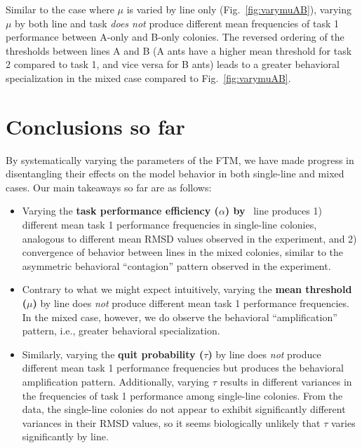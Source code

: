 \documentclass[11pt]{article}
\begin{document}
Similar to the case where $\mu$ is varied by line only (Fig.~\ref{fig:varymuAB}), varying $\mu$ by both line and task \textit{does not} produce different mean frequencies of task 1 performance between A-only and B-only colonies. The reversed ordering of the thresholds between lines A and B (A ants have a higher mean threshold for task 2 compared to task 1, and vice versa for B ants) leads to a greater behavioral specialization in the mixed case compared to Fig.~\ref{fig:varymuAB}.

\section{Conclusions so far}

By systematically varying the parameters of the FTM, we have made progress in disentangling their effects on the model behavior in both single-line and mixed cases. Our main takeaways so far are as follows:

\begin{itemize}
	\item Varying the \textbf{task performance efficiency ($\alpha$) by }\ line produces 1) different mean task 1 performance frequencies in single-line colonies, analogous to different mean RMSD values observed in the experiment, and 2) convergence of behavior between lines in the mixed colonies, similar to the asymmetric behavioral ``contagion'' pattern observed in the experiment.
	
	\item Contrary to what we might expect intuitively, varying the \textbf{mean threshold ($\mu$)} by line does \textit{not} produce different mean task 1 performance frequencies. In the mixed case, however, we do observe the behavioral ``amplification'' pattern, i.e., greater behavioral specialization.

	\item Similarly, varying the \textbf{quit probability ($\tau$)} by line does \textit{not} produce different mean task 1 performance frequencies but produces the behavioral amplification pattern. Additionally, varying $\tau$ results in different variances in the frequencies of task 1 performance among single-line colonies. 
	From the data, the single-line colonies do not appear to exhibit significantly different variances in their RMSD values,
so it seems biologically unlikely that $\tau$ varies significantly by line.

\end{itemize}
\end{document}
